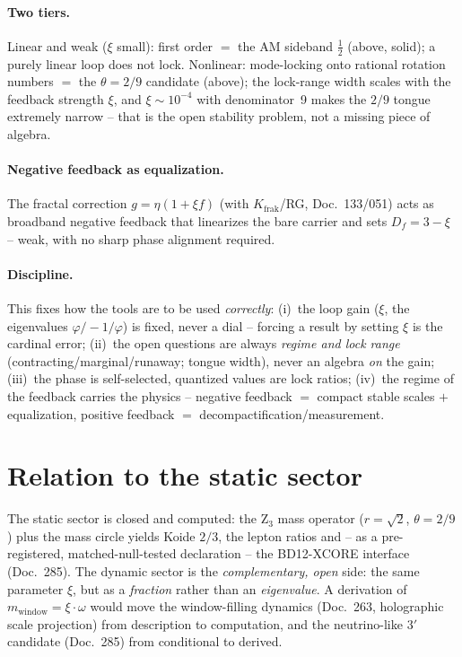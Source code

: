 \paragraph{Two tiers.} Linear and weak ($\xi$ small): first order $=$ the AM sideband $\tfrac12$ (above,
solid); a purely linear loop does not lock. Nonlinear: mode-locking onto rational rotation numbers $=$
the $\theta=2/9$ candidate (above); the lock-range width scales with the feedback strength $\xi$, and
$\xi\sim10^{-4}$ with denominator~9 makes the $2/9$ tongue extremely narrow -- that is the open
stability problem, not a missing piece of algebra.

\paragraph{Negative feedback as equalization.} The fractal correction $g=\eta(1+\xi f)$ (with
$K_{\text{frak}}$/RG, Doc.~133/051) acts as broadband negative feedback that linearizes the bare carrier
and sets $D_f=3-\xi$ -- weak, with no sharp phase alignment required.

\paragraph{Discipline.} This fixes how the tools are to be used \emph{correctly}: (i)~the loop gain
($\xi$, the eigenvalues $\varphi/{-}1/\varphi$) is fixed, never a dial -- forcing a result by setting
$\xi$ is the cardinal error; (ii)~the open questions are always \emph{regime and lock range}
(contracting/marginal/runaway; tongue width), never an algebra \emph{on} the gain; (iii)~the phase is
self-selected, quantized values are lock ratios; (iv)~the regime of the feedback carries the physics --
negative feedback $=$ compact stable scales $+$ equalization, positive feedback $=$
decompactification/measurement.

\section{Relation to the static sector}
The static sector is closed and computed: the Z$_3$ mass operator ($r=\sqrt2$, $\theta=2/9$) plus the
mass circle yields Koide $2/3$, the lepton ratios and -- as a pre-registered, matched-null-tested
declaration -- the BD12-XCORE interface (Doc.~285). The dynamic sector is the \emph{complementary,
open} side: the same parameter $\xi$, but as a \emph{fraction} rather than an \emph{eigenvalue}. A
derivation of $m_{\text{window}}=\xi\cdot\omega$ would move the window-filling dynamics (Doc.~263,
holographic scale projection) from description to computation, and the neutrino-like $3'$ candidate
(Doc.~285) from conditional to derived.

